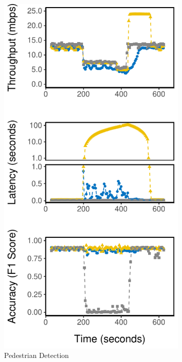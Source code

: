 \begin{figure}[!htb]
\begin{subfigure}[t]{0.3\textwidth}
    \includegraphics[width=\textwidth]{figures/runtime-mot-verticle.pdf}
    \caption{Pedestrian Detection}
    \label{fig:pd-runtime}
  \end{subfigure}
  \hfill
  \begin{subfigure}[t]{0.3\textwidth}
    \centering

\end{subfigure}
\end{figure}
